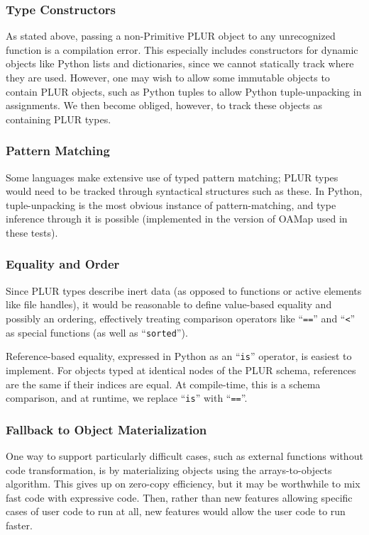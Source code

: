\documentclass[10pt, conference, compsocconf]{IEEEtran}
\begin{document}
\subsubsection{Type Constructors}

As stated above, passing a non-Primitive PLUR object to any unrecognized function is a compilation error. This especially includes constructors for dynamic objects like Python lists and dictionaries, since we cannot statically track where they are used. However, one may wish to allow some immutable objects to contain PLUR objects, such as Python tuples to allow Python tuple-unpacking in assignments. We then become obliged, however, to track these objects as containing PLUR types.

\subsubsection{Pattern Matching}

Some languages make extensive use of typed pattern matching; PLUR types would need to be tracked through syntactical structures such as these. In Python, tuple-unpacking is the most obvious instance of pattern-matching, and type inference through it is possible (implemented in the version of OAMap used in these tests).

\subsubsection{Equality and Order}

Since PLUR types describe inert data (as opposed to functions or active elements like file handles), it would be reasonable to define value-based equality and possibly an ordering, effectively treating comparison operators like ``{\tt ==}'' and ``{\tt <}'' as special functions (as well as ``{\tt sorted}'').

Reference-based equality, expressed in Python as an ``{\tt is}'' operator, is easiest to implement. For objects typed at identical nodes of the PLUR schema, references are the same if their indices are equal. At compile-time, this is a schema comparison, and at runtime, we replace ``{\tt is}'' with ``{\tt ==}''.

\subsubsection{Fallback to Object Materialization}

One way to support particularly difficult cases, such as external functions without code transformation, is by materializing objects using the arrays-to-objects algorithm. This gives up on zero-copy efficiency, but it may be worthwhile to mix fast code with expressive code. Then, rather than new features allowing specific cases of user code to run at all, new features would allow the user code to run faster.
\end{document}
